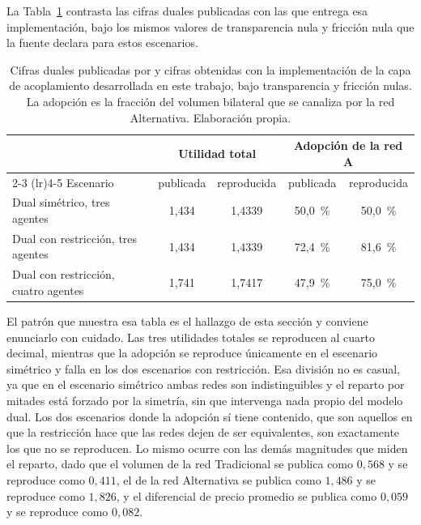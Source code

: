 La Tabla~\ref{tab:reproduccion-dual} contrasta las cifras duales publicadas con
las que entrega esa implementación, bajo los mismos valores de transparencia nula
y fricción nula que la fuente declara para estos escenarios.

\begin{table}[H]
    \centering
    \small
    \caption[Reproducción de los escenarios duales]{Cifras duales publicadas por
     y cifras obtenidas con la implementación de
    la capa de acoplamiento desarrollada en este trabajo, bajo transparencia y
    fricción nulas. La adopción es la fracción del volumen bilateral que se canaliza
    por la red Alternativa. Elaboración propia.}
    \label{tab:reproduccion-dual}
    \begin{tabular}{p{4.6cm}cccc}
        \toprule
         & \multicolumn{2}{c}{Utilidad total} & \multicolumn{2}{c}{Adopción de la red A} \\
        \cmidrule(lr){2-3} \cmidrule(lr){4-5}
        Escenario & publicada & reproducida & publicada & reproducida \\
        \midrule
        Dual simétrico, tres agentes & 1,434 & 1,4339 & 50,0~\% & 50,0~\% \\
        Dual con restricción, tres agentes & 1,434 & 1,4339 & 72,4~\% & 81,6~\% \\
        Dual con restricción, cuatro agentes & 1,741 & 1,7417 & 47,9~\% & 75,0~\% \\
        \bottomrule
    \end{tabular}
\end{table}

El patrón que muestra esa tabla es el hallazgo de esta sección y conviene
enunciarlo con cuidado. Las tres utilidades totales se reproducen al cuarto
decimal, mientras que la adopción se reproduce únicamente en el escenario
simétrico y falla en los dos escenarios con restricción. Esa división no es
casual, ya que en el escenario simétrico ambas redes son indistinguibles y el
reparto por mitades está forzado por la simetría, sin que intervenga nada
propio del modelo dual. Los dos escenarios donde la adopción sí tiene contenido,
que son aquellos en que la restricción hace que las redes dejen de ser
equivalentes, son exactamente los que no se reproducen. Lo mismo ocurre con las
demás magnitudes que miden el reparto, dado que el volumen de la red Tradicional
se publica como $0,568$ y se reproduce como $0,411$, el de la red Alternativa se
publica como $1,486$ y se reproduce como $1,826$, y el diferencial de precio
promedio se publica como $0,059$ y se reproduce como $0,082$.

